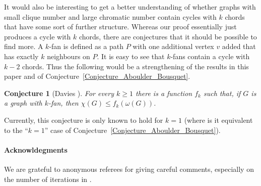 \documentclass[11pt,english]{article}
\theoremstyle{plain}
\newtheorem{conj}[thm]{Conjecture}
\theoremstyle{definition}
\theoremstyle{remark}
\begin{document}
  It would also be interesting to get a better understanding of whether graphs with small clique number and large chromatic number contain cycles with $k$ chords that have some sort of further structure. Whereas our proof essentially just produces a cycle with $k$ chords, there are conjectures that it should be possible to find more. A $k$-fan is defined as a path $P$ with one additional vertex $v$ added that has exactly $k$ neighbours on $P$. It is easy to see that $k$-fans contain a cycle with $k-2$ chords. Thus the following would be a strengthening of the results in this paper and of Conjecture~\ref{Conjecture_Aboulder_Bousquet}.
	    \begin{conj}[Davies \cite{davies2023triangle}]
        For \emph{every} $k \ge 1$ there is a function $f_k$ such that, if $G$ is a graph with $k$-fan, then $\chi(G) \le f_k(\omega(G))$.
    \end{conj}	
    Currently, this conjecture is only known to hold for $k=1$ (where is it equivalent to the ``$k=1$'' case of Conjecture~\ref{Conjecture_Aboulder_Bousquet}).

\paragraph{Acknowldegments}
We are grateful to anonymous referees for giving careful comments, especially on the number of iterations in .



\end{document}
